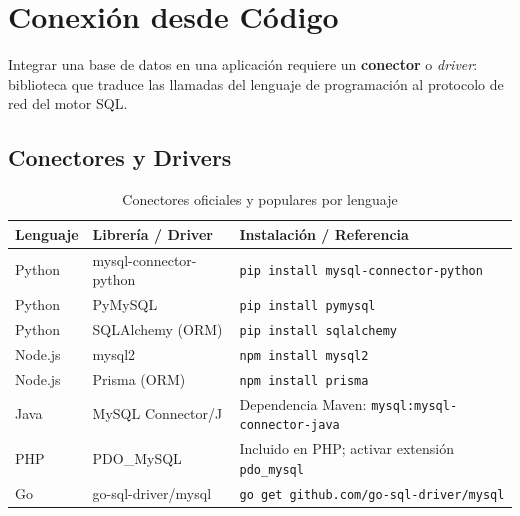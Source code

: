 \newpage
\section{Conexión desde Código}

Integrar una base de datos en una aplicación requiere un \textbf{conector}
o \textit{driver}: biblioteca que traduce las llamadas del lenguaje de
programación al protocolo de red del motor SQL.

\subsection{Conectores y Drivers}

\begin{table}[H]
  \centering
  \caption{Conectores oficiales y populares por lenguaje}
  \renewcommand{\arraystretch}{1.3}
  \begin{tabularx}{\textwidth}{l >{\ttfamily}l X}
    \toprule
    \textbf{Lenguaje} & \textbf{Librería / Driver}  & \textbf{Instalación / Referencia}          \\
    \midrule
    Python   & mysql-connector-python & \texttt{pip install mysql-connector-python} \\
    Python   & PyMySQL                & \texttt{pip install pymysql}                \\
    Python   & SQLAlchemy (ORM)       & \texttt{pip install sqlalchemy}             \\
    Node.js  & mysql2                 & \texttt{npm install mysql2}                 \\
    Node.js  & Prisma (ORM)           & \texttt{npm install prisma}                 \\
    Java     & MySQL Connector/J      & Dependencia Maven: \texttt{mysql:mysql-connector-java} \\
    PHP      & PDO\_MySQL             & Incluido en PHP; activar extensión \texttt{pdo\_mysql} \\
    Go       & go-sql-driver/mysql    & \texttt{go get github.com/go-sql-driver/mysql} \\
    \bottomrule
  \end{tabularx}
\end{table}


